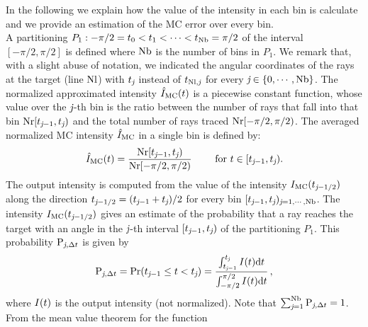 In the following we explain how the value of the intensity in each bin is calculate and we provide an estimation of the MC error over every bin. \\ \indent A partitioning
$P_1: -\pi/2 = t_{0}<t_{1}<\cdots <t_{\textrm{Nb}}=\pi/2$ of the interval $[-\pi/2, \pi/2]$ is defined where $\textrm{Nb}$ is the number of bins in $P_1$.
We remark that, with a slight abuse of notation, we indicated the angular coordinates of the rays at the target (line $\textrm{Nl}$) with $t_{\textit{j}}$ instead of $t_{\textrm{Nl},\textit{j}}$ for every $\textit{j}\in\{0, \cdots, \textrm{Nb}\}$. 
The normalized approximated intensity $\hat{I}_{\textrm{MC}}(t)$ is a piecewise constant function, whose value over the $\textit{j}$-th bin is the ratio between the number of rays that fall into that bin
$\textrm{Nr}[t_{\textit{j}-1},t_{\textit{j}})$ and the total number of rays traced $\textrm{Nr}[-\pi/2, \pi/2)$.
The averaged normalized MC intensity $\hat{I}_{\textrm{MC}}$ in a single bin is defined by:
\begin{equation} \label{g_mc}
\hat{I}_{\textrm{MC}}(t) = \frac{\textrm{Nr}[t_{\textit{j}-1},t_{\textit{j}})}{\textrm{Nr}[-\pi/2, \pi/2)} \qquad \mbox{ for } t\in[t_{\textit{j}-1}, t_{\textit{j}}).
\end{equation}
The output intensity is computed from the value of the intensity $I_{\textrm{MC}}(t_{\textit{j}-1/2})$ along the direction $t_{\textit{j}-1/2}=(t_{\textit{j}-1}+
t_{\textit{j}})/2$ for every bin $[t_{\textit{j}-1},t_{\textit{j}})_{\textit{j} = 1, \cdots, \textrm{Nb}}$.
 The intensity $I_{\textrm{MC}}(t_{\textit{j}-1/2})$ gives an estimate of the probability that a ray reaches the target with an angle in the $\textit{j}$-th interval
$[t_{\textit{j}-1}, t_{\textit{j}})$ of the partitioning $P_1$. This probability $\textrm{P}_{\textit{j}, \Delta t}$ is given by
\begin{equation}\label{eq:probability}
\textrm{P}_{\textit{j}, \Delta t} = \Pr(t_{\textit{j}-1}\leq t<t_{\textit{j}})=
\frac{\int_{t_{\textit{j}-1}}^{t_{\textit{j}}} I(t) \textrm{d}t}{\int_{-\pi/2}^{\pi/2}I(t) \textrm{d}t}\,,
\end{equation}
where $I(t)$ is the output intensity (not normalized).
Note that $\sum_{\textit{j}=1}^{\textrm{Nb}}\textrm{P}_{\textit{j}, \Delta t}=1$. From the mean value theorem for the function
